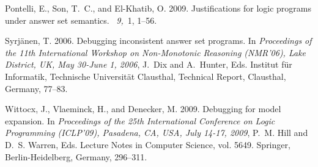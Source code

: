 \documentclass{tlp}
\begin{document}
\begin{thebibliography}{}
{\sc Pontelli, E.}, {\sc Son, T.~C.}, {\sc and} {\sc El-Khatib, O.} 2009.
\newblock Justifications for logic programs under answer set semantics.
~{\em 9,\/}~1, 1--56.

{\sc Syrj\"anen, T.} 2006.
\newblock Debugging inconsistent answer set programs.
\newblock In {\em Proceedings of the 11th International Workshop on
  Non-Monotonic Reasoning {\rm (}NMR'06{\rm )}, Lake District, UK, May 30-June
  1, 2006}, {J.~Dix} {and} {A.~Hunter}, Eds. Institut f{\"u}r Informatik,
  Technische Universit{\"a}t Clausthal, Technical Report, Clausthal, Germany,
  77--83.

{\sc Wittocx, J.}, {\sc Vlaeminck, H.}, {\sc and} {\sc Denecker, M.} 2009.
\newblock Debugging for model expansion.
\newblock In {\em Proceedings of the 25th International Conference on Logic
  Programming {\rm (}ICLP'09{\rm )}, Pasadena, CA, USA, July 14-17, 2009},
  {P.~M. Hill} {and} {D.~S. Warren}, Eds. Lecture Notes in Computer Science,
  vol. 5649. Springer, Berlin-Heidelberg, Germany, 296--311.

\end{thebibliography}
\end{document}
